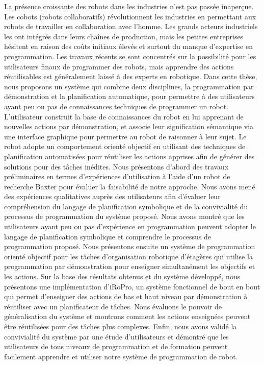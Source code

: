 La présence croissante des robots dans les industries n'est pas passée inaperçue. 
Les cobots (robots collaboratifs) révolutionnent les industries en permettant aux robots de travailler en collaboration avec l'homme.
Les grands acteurs industriels les ont intégrés dans leurs chaînes de production, mais les petites entreprises hésitent en raison des coûts initiaux élevés et surtout du manque d'expertise en programmation. 
Les travaux récents se sont concentrés sur la possibilité pour les utilisateurs finaux de programmer des robots, mais apprendre des actions réutilisables est généralement laissé à des experts en robotique.
Dans cette thèse, nous proposons un système qui combine deux disciplines, la programmation par démonstration et la planification automatique, pour permettre à des utilisateurs ayant peu ou pas de connaissances techniques de programmer un robot. 
L'utilisateur construit la base de connaissances du robot en lui apprenant de nouvelles actions par démonstration, et associe leur signification sémantique via une interface graphique pour permettre au robot de raisonner à leur sujet. 
Le robot adopte un comportement orienté objectif en utilisant des techniques de planification automatisées pour réutiliser les actions apprises afin de générer des solutions pour des tâches inédites.
Nous présentons d'abord des travaux préliminaires en termes d'expériences d'utilisation à l'aide d'un robot de recherche Baxter pour évaluer la faisabilité de notre approche.
Nous avons mené des expériences qualitatives auprès des utilisateurs afin d'évaluer leur compréhension du langage de planification symbolique et de la convivialité du processus de programmation du système proposé.
Nous avons montré que les utilisateurs ayant peu ou pas d'expérience en programmation peuvent adopter le langage de planification symbolique et comprendre le processus de programmation proposé.
Nous présentons ensuite un système de programmation orienté objectif pour les tâches d'organisation robotique d'étagères qui utilise la programmation par démonstration pour enseigner simultanément les objectifs et les actions.
Sur la base des résultats obtenus et du système développé, nous présentons une implémentation d'iRoPro, un système fonctionnel de bout en bout qui permet d'enseigner des actions de bas et haut niveau par démonstration à réutiliser avec un planificateur de tâches.
Nous évaluons le pouvoir de généralisation du système et montrons comment les actions enseignées peuvent être réutilisées pour des tâches plus complexes.
Enfin, nous avons validé la convivialité du système par une étude d'utilisateurs et démontré que les utilisateurs de tous niveaux de programmation et de formation peuvent facilement apprendre et utiliser notre système de programmation de robot.


